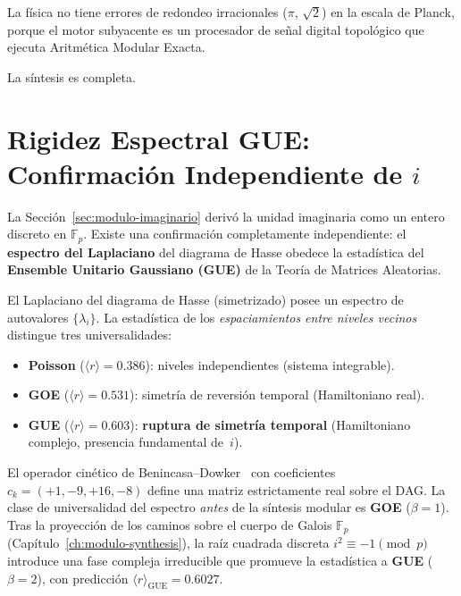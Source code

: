 \documentclass[11pt, a4paper, openany]{book}
\begin{document}
La f\'isica no tiene errores de redondeo irracionales ($\pi$,
$\sqrt{2}$) en la escala de Planck, porque el motor subyacente es un
procesador de se\~nal digital topol\'ogico que ejecuta Aritm\'etica
Modular Exacta.

La s\'intesis es completa.

\section{Rigidez Espectral GUE: Confirmaci\'on Independiente de $i$}
\label{sec:gue-spectral}

La Secci\'on~\ref{sec:modulo-imaginario} deriv\'o la unidad imaginaria
como un entero discreto en $\mathbb{F}_p$. Existe una confirmaci\'on
completamente independiente: el \textbf{espectro del Laplaciano} del
diagrama de Hasse obedece la estad\'istica del
\textbf{Ensemble Unitario Gaussiano (GUE)} de la Teor\'ia de
Matrices Aleatorias.

El Laplaciano del diagrama de Hasse (simetrizado) posee un espectro
de autovalores $\{\lambda_i\}$. La estad\'istica de los
\emph{espaciamientos entre niveles vecinos} distingue tres
universalidades:
\begin{itemize}
  \item \textbf{Poisson} ($\langle r \rangle = 0{.}386$): niveles
    independientes (sistema integrable).
  \item \textbf{GOE} ($\langle r \rangle = 0{.}531$): simetr\'ia de
    reversi\'on temporal (Hamiltoniano real).
  \item \textbf{GUE} ($\langle r \rangle = 0{.}603$): \textbf{ruptura
    de simetr\'ia temporal} (Hamiltoniano complejo, presencia
    fundamental de~$i$).
\end{itemize}

\begin{theorem}
\label{thm:gue-spectral}
El operador cin\'etico de Benincasa--Dowker~\cite{benincasa2010} con
coeficientes $c_k = (+1, -9, +16, -8)$ define una matriz estrictamente
real sobre el DAG. La clase de universalidad del espectro \emph{antes}
de la s\'intesis modular es \textbf{GOE} ($\beta = 1$). Tras la
proyecci\'on de los caminos sobre el cuerpo de Galois
$\mathbb{F}_p$ (Cap\'itulo~\ref{ch:modulo-synthesis}), la ra\'iz
cuadrada discreta $i^2 \equiv -1 \pmod{p}$ introduce una fase compleja
irreducible que promueve la estad\'istica a \textbf{GUE}
($\beta = 2$), con predicci\'on
$\langle r \rangle_{\mathrm{GUE}} = 0{.}6027$.
\end{theorem}
\end{document}

